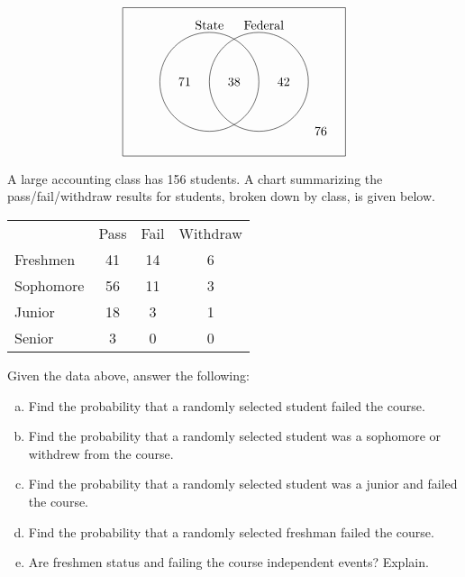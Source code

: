 \documentclass[11pt,letterpaper]{article}
\begin{document}
	\vfill
	
	\[
	\begin{tikzpicture}[scale=0.69]
	\draw (0,0) rectangle (9,6);
	\draw (3.5,3) circle (2);
	\draw (5.5,3) circle (2);
	
	\node at (3.5,5.3) {State};
	\node at (5.7,5.3) {Federal}; 
	
	\node at (2.5,3) {71};
	\node at (4.5,3) {38};
	\node at (6.5,3) {42};
	\node at (8,1) {76};
	\end{tikzpicture}
	\]



\newpage



 A large accounting class has 156 students. A chart summarizing the pass/fail/withdraw results for students, broken down by class, is given below. \par
	\begin{table}[H]
	\centering
	\begin{tabular}{lccc}
	& Pass & Fail & Withdraw \\ \cline{2-4} 
	\multicolumn{1}{l|}{Freshmen} & \multicolumn{1}{c|}{41} & \multicolumn{1}{c|}{14} & \multicolumn{1}{c|}{6} \\ \cline{2-4} 
	\multicolumn{1}{l|}{Sophomore} & \multicolumn{1}{c|}{56} & \multicolumn{1}{c|}{11} & \multicolumn{1}{c|}{3} \\ \cline{2-4} 
	\multicolumn{1}{l|}{Junior} & \multicolumn{1}{c|}{18} & \multicolumn{1}{c|}{3} & \multicolumn{1}{c|}{1} \\ \cline{2-4} 
	\multicolumn{1}{l|}{Senior} & \multicolumn{1}{c|}{3} & \multicolumn{1}{c|}{0} & \multicolumn{1}{c|}{0} \\ \cline{2-4} 
	\end{tabular}
	\end{table} \pspace
Given the data above, answer the following:
	\begin{enumerate}[(a)]
	\item Find the probability that a randomly selected student failed the course.
	\item Find the probability that a randomly selected student was a sophomore or withdrew from the course.
	\item Find the probability that a randomly selected student was a junior and failed the course.
	\item Find the probability that a randomly selected freshman failed the course.
	\item Are freshmen status and failing the course independent events? Explain. 
	\end{enumerate} \pspace
\end{document}
